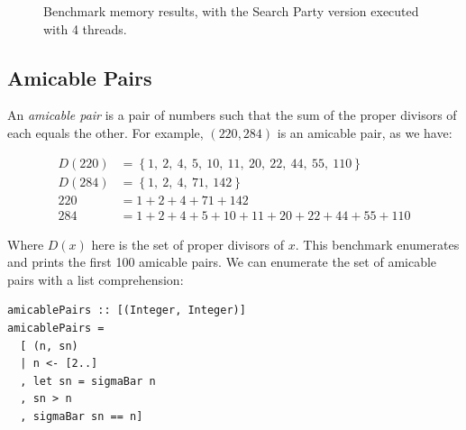 \begin{figure}[t]


  \caption{Benchmark memory results, with the Search Party version
    executed with 4 threads.}
  \label{fig:searchparty-examples-space}
\end{figure}

\subsection*{Amicable Pairs}
\label{sec:searchparty-examples-amis}

An \textit{amicable pair} is a pair of numbers such that the sum of
the proper divisors of each equals the other. For example, $(220,
284)$ is an amicable pair, as we have:

\begin{align*}
  D(220) &= \left\{1,~2,~4,~5,~10,~11,~20,~22,~44,~55,~110\right\}\\
  D(284) &= \left\{1,~2,~4,~71,~142\right\}\\
  220    &= 1 + 2 + 4 + 71 + 142\\
  284    &= 1 + 2 + 4 + 5 + 10 + 11 + 20 + 22 + 44 + 55 + 110
\end{align*}

Where $D(x)$ here is the set of proper divisors of $x$. This benchmark
enumerates and prints the first 100 amicable pairs. We can enumerate
the set of amicable pairs with a list comprehension:

\begin{verbatim}
amicablePairs :: [(Integer, Integer)]
amicablePairs =
  [ (n, sn)
  | n <- [2..]
  , let sn = sigmaBar n
  , sn > n
  , sigmaBar sn == n]
\end{verbatim}

